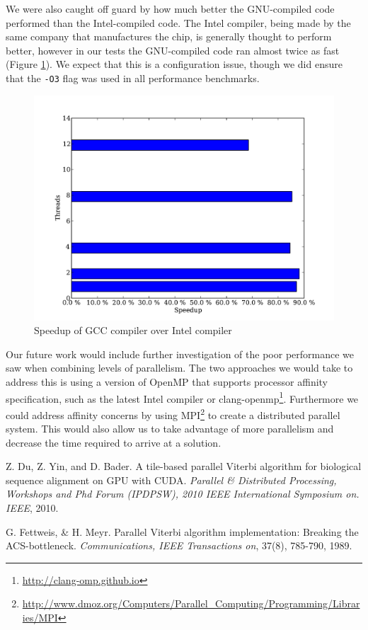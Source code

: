 \documentclass[11pt,onecolumn]{article}
\begin{document}
We were also caught off guard by how much better the GNU-compiled code performed than the Intel-compiled code. The Intel compiler, being made by the same company that manufactures the chip, is generally thought to perform better, however in our tests the GNU-compiled code ran almost twice as fast (Figure \ref{fig:gccvsintel}). We expect that this is a configuration issue, though we did ensure that the \texttt{-O3} flag was used in all performance benchmarks.

\begin{figure}[h!]
\centering
\includegraphics[width=.75\linewidth]{figures/comparison_of_intel_and_gnu_comiler_performance}
\caption{Speedup of GCC compiler over Intel compiler}
\label{fig:gccvsintel}
\end{figure}


Our future work would include further investigation of the poor performance we saw when combining levels of parallelism. The two approaches we would take to address this is using a version of OpenMP that supports processor affinity specification, such as the latest Intel compiler or clang-openmp\footnote{\url{http://clang-omp.github.io}}. Furthermore we could address affinity concerns by using MPI\footnote{\url{http://www.dmoz.org/Computers/Parallel_Computing/Programming/Libraries/MPI}} to create a distributed parallel system. This would also allow us to take advantage of more parallelism and decrease the time required to arrive at a solution.


\begin{thebibliography}{1}
\small

Z. Du, Z. Yin, and D. Bader. A tile-based parallel Viterbi algorithm for biological sequence alignment on GPU with CUDA. \emph{Parallel \& Distributed Processing, Workshops and Phd Forum (IPDPSW), 2010 IEEE International Symposium on. IEEE}, 2010.

G. Fettweis, \& H. Meyr. Parallel Viterbi algorithm implementation: Breaking the ACS-bottleneck. \emph{Communications, IEEE Transactions on}, 37(8), 785-790,  1989.


\end{thebibliography}
\end{document}
